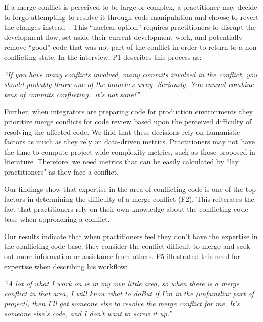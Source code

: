 If a merge conflict is perceived to be large or complex, a practitioner may decide to forgo attempting to resolve it through code manipulation and choose to revert the changes instead~\cite{Guzzi2015}.
This ``nuclear option'' requires practitioners to disrupt the development flow, set aside their current development work, and potentially remove ``good'' code that was not part of the conflict in order to return to a non-conflicting state.
In the interview, P1 describes this process as:
\begin{displayquote}
\textit{``If you have many conflicts involved, many commits involved in the conflict, you should probably throw one of the branches away. Seriously. You cannot combine tens of commits conflicting...it's not sane!''}
\end{displayquote}

Further, when integrators are preparing code for production environments they prioritize merge conflicts for code review based upon the perceived difficulty of resolving the affected code.
We find that these decisions rely on humanistic factors as much as they rely on data-driven metrics.
Practitioners may not have the time to compute project-wide complexity metrics, such as those proposed in  literature. Therefore, we need metrics that can be easily calculated by ``lay practitioners" as they face a conflict. 

\label{knowledge-based-factors}
Our findings show that expertise in the area of conflicting code is one of the top factors in determining the difficulty of a merge conflict (F2). This reiterates the fact that practitioners rely on their own knowledge about the conflicting code base when approaching a conflict. 

Our results indicate that when practitioners feel they don't have the expertise in the conflicting code base, they consider the conflict difficult to merge and seek out more information or assistance from others. 
P5 illustrated this need for expertise when describing his workflow: 
\begin{displayquote}
	\textit{``A lot of what I work on is in my own little area, so when there is a merge conflict in that area, I will know what to do\textellipsis But if I'm in the [unfamiliar part of project], then I'll get someone else to resolve the merge conflict for me. It's someone else's code, and I don't want to screw it up.''}
\end{displayquote}



